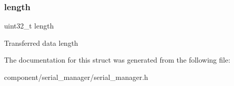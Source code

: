 \subsubsection{\texorpdfstring{length}{length}}
{\footnotesize\ttfamily uint32\+\_\+t length}

Transferred data length 

The documentation for this struct was generated from the following file\+:\begin{DoxyCompactItemize}
\item 
component/serial\+\_\+manager/serial\+\_\+manager.\+h\end{DoxyCompactItemize}
